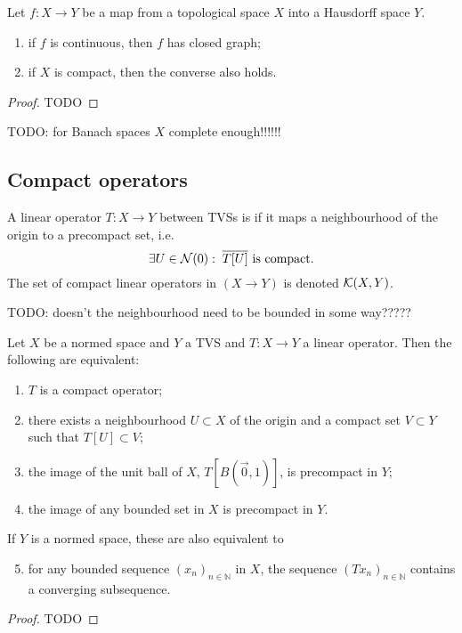 \begin{theorem} \label{closedGraphTheorem}
Let $f:X\to Y$ be a map from a topological space $X$ into a Hausdorff space $Y$.
\begin{enumerate}
\item if $f$ is continuous, then $f$ has closed graph;
\item if $X$ is compact, then the converse also holds.
\end{enumerate}
\end{theorem}
\begin{proof}
TODO
\end{proof}
TODO: for Banach spaces $X$ complete enough!!!!!!


\subsection{Compact operators}
\begin{definition}
A linear operator $T:X\to Y$ between TVSs is  if it maps a neighbourhood of the origin to a precompact set, i.e.\ 
\[ \exists U \in \operatorname{\mathcal{N}}(0): \;  \text{$\overline{T[U]}$ is compact.} \]
The set of compact linear operators in $(X\to Y)$ is denoted $\operatorname{\mathcal{K}}(X,Y)$.
\end{definition}
TODO: doesn't the neighbourhood need to be bounded in some way?????

\begin{proposition}
Let $X$ be a normed space and $Y$ a TVS and $T:X\to Y$ a linear operator. Then the following are equivalent:
\begin{enumerate}
\item $T$ is a compact operator;
\item there exists a neighbourhood $U \subset X$ of the origin and a compact set $V\subset Y$ such that $T[U] \subset V$;
\item the image of the unit ball of $X$, $T[B(\vec{0},1)]$, is precompact in $Y$;
\item the image of any bounded set in $X$ is precompact in $Y$.
\end{enumerate}
If $Y$ is a normed space, these are also equivalent to
\begin{enumerate} \setcounter{enumi}{4}
\item for any bounded sequence $(x_{n})_{n\in \mathbb{N}}$ in $X$, the sequence $(Tx_{n})_{n\in \mathbb{N} }$ contains a converging subsequence.
\end{enumerate}
\end{proposition}
\begin{proof}
TODO
\end{proof}


